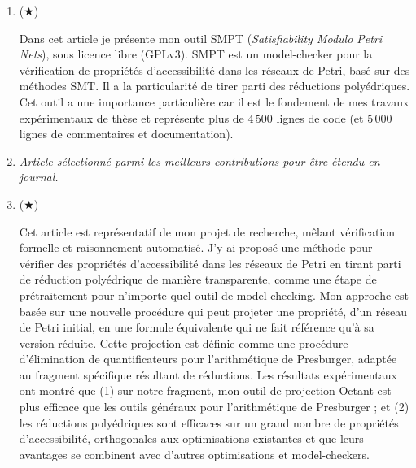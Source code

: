 \begin{enumerate}
  \smallbreak
  \item ($\bigstar$) \cite{amat_smpt_2023} 
  \begin{mdframed}
    Dans cet article je présente mon outil \textsf{SMPT} (\emph{Satisfiability
    Modulo Petri Nets}), sous licence libre (GPLv3). \textsf{SMPT} est un
    model-checker pour la vérification de propriétés d'accessibilité dans les
    réseaux de Petri, basé sur des méthodes SMT. Il a la particularité de tirer
    parti des réductions polyédriques. Cet outil a une importance particulière car
    il est le fondement de mes travaux expérimentaux de thèse et représente plus de
    $4\,500$ lignes de code (et $5\, 000$ lignes de commentaires et documentation). 
  \end{mdframed}
  \smallbreak
  \item \cite{amat_automated_2023} 
  \smallbreak
  \emph{Article sélectionné parmi les meilleurs contributions pour être étendu en journal.}
  \smallbreak
  \item ($\bigstar$) \cite{amat_project_2024} 
  \begin{mdframed}
    Cet article est représentatif de mon projet de recherche, mêlant vérification
  formelle et raisonnement automatisé. J'y ai proposé une méthode pour vérifier
  des propriétés d'accessibilité dans les réseaux de Petri en tirant parti de
  réduction polyédrique de manière transparente, comme une étape de prétraitement
  pour n'importe quel outil de model-checking. Mon approche est basée sur une
  nouvelle procédure qui peut projeter une propriété, d'un réseau de Petri
  initial, en une formule équivalente qui ne fait référence qu'à sa version
  réduite. Cette projection est définie comme une procédure d'élimination de
  quantificateurs pour l'arithmétique de Presburger, adaptée au fragment
  spécifique résultant de réductions. Les résultats expérimentaux ont montré
  que (1) sur notre fragment, mon outil de projection \textsf{Octant} est
  plus efficace que les outils généraux pour l'arithmétique de Presburger ; et (2)
  les réductions polyédriques sont efficaces sur un grand nombre de propriétés
  d'accessibilité, orthogonales aux optimisations existantes et que leurs
  avantages se combinent avec d'autres optimisations et model-checkers.
  \end{mdframed}
\end{enumerate}

